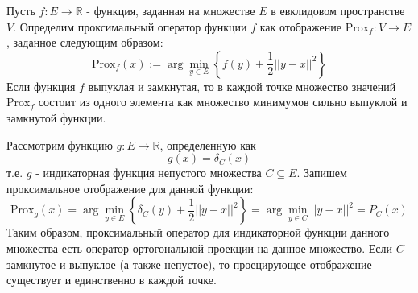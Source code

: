 Пусть $f: E \to \mathbb{R}$  - функция, заданная на множестве $E$ в евклидовом пространстве $V$. Определим проксимальный оператор функции $f$ как отображение $\text{Prox}_f : V \to E$, заданное следующим образом: $$ \text{Prox}_f(x) := \arg\min\limits_{y \in E} \left\{f(y) + \frac{1}{2} ||y-x||^2 \right \}$$ Если функция $f$ выпуклая и замкнутая, то в каждой точке множество значений $\text{Prox}_f$ состоит из одного элемента как множество минимумов сильно выпуклой и замкнутой функции. 

Рассмотрим функцию $g: E \to \mathbb{R}$, определенную как $$g(x) = \delta_C (x)$$ т.е. $g$ - индикаторная функция непустого множества $C \subseteq E$. Запишем проксимальное отображение для данной функции: $$\text{Prox}_g(x) = \arg\min\limits_{y \in E} \left\{ \delta_C(y) + \frac{1}{2}||y-x||^2 \right\} = \arg\min\limits_{y \in C} ||y-x||^2 = P_C(x)$$   Таким образом, проксимальный оператор для индикаторной функции данного множества есть оператор ортогональной проекции на данное множество. Если $C$ - замкнутое и выпуклое (а также непустое), то проецирующее отображение существует и единственно в каждой точке.
